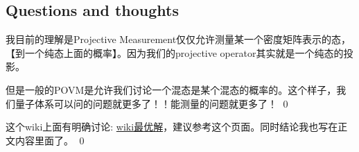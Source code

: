\bigskip
{}


\subsection{Questions and thoughts}


我目前的理解是Projective
Measurement仅仅允许测量某一个密度矩阵表示的态，【到一个纯态上面的概率】。因为我们的projective operator其实就是一个纯态的投影。

但是一般的POVM是允许我们讨论一个混态是某个混态的概率的。这个样子，我们量子体系可以问的问题就更多了！！能测量的问题就更多了！
\qed

\bigskip
{}

这个wiki上面有明确讨论:
\href{https://en.wikipedia.org/wiki/POVM#An_example:_unambiguous_quantum_state_discrimination}{wiki最优解}，建议参考这个页面。同时结论我也写在正文内容里面了。
\qed
